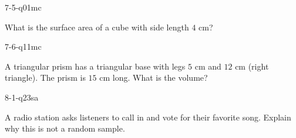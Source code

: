 \begin{practiceQuestion}{7-5-q01}{mc}
\begin{questionText}
What is the surface area of a cube with side length $4$ cm?
\end{questionText}
\end{practiceQuestion}

\begin{practiceQuestion}{7-6-q11}{mc}
\begin{questionText}
A triangular prism has a triangular base with legs $5$ cm and $12$ cm (right triangle). The prism is $15$ cm long. What is the volume?
\end{questionText}
\end{practiceQuestion}

\begin{practiceQuestion}{8-1-q23}{sa}
\begin{questionText}
A radio station asks listeners to call in and vote for their favorite song. Explain why this is not a random sample.
\end{questionText}
\end{practiceQuestion}

